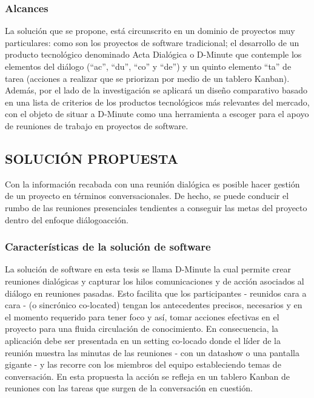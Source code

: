 \subsubsection{Alcances}

La solución que se propone, está circunscrito en un dominio de proyectos muy particulares: como son los proyectos de software tradicional; el desarrollo de un producto tecnológico denominado Acta Dialógica o D-Minute que contemple los elementos del diálogo (“ac”, “du”, “co” y “de”) y un quinto elemento “ta” de tarea (acciones a realizar que se priorizan por medio de un tablero Kanban). Además, por el lado de la investigación se aplicará un diseño comparativo basado en una lista de criterios de los productos tecnológicos más relevantes del mercado, con el objeto de situar a D-Minute como una herramienta a escoger para el apoyo de reuniones de trabajo en proyectos de software.

\subsection{SOLUCIÓN PROPUESTA}

Con la información recabada con una reunión dialógica es posible hacer gestión de un proyecto en términos conversacionales. De hecho, se puede conducir el rumbo de las reuniones presenciales tendientes a conseguir las metas del proyecto dentro del enfoque diálogo\/acción.

\subsubsection{Características de la solución de software}

La solución de software en esta tesis se llama D-Minute la cual permite crear reuniones dialógicas y capturar los hilos comunicaciones y de acción asociados al diálogo en reuniones pasadas. Esto facilita que los participantes - reunidos cara a cara - (o sincrónico co-located) tengan los antecedentes precisos, necesarios y en el momento requerido para tener foco y así, tomar acciones efectivas en el proyecto para una fluida circulación de conocimiento. En consecuencia, la aplicación debe ser presentada en un setting co-locado donde el líder de la reunión muestra las minutas de las reuniones - con un datashow o una pantalla gigante - y las recorre con los miembros del equipo estableciendo temas de conversación. En esta propuesta la acción se refleja en un tablero Kanban de reuniones con las tareas que surgen de la conversación en cuestión.


